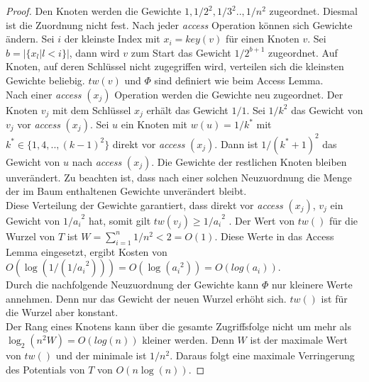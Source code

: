 \documentclass[a4paper,12pt]{article}
\begin{document}
\begin{proof}
	Den Knoten werden die Gewichte $1, 1/2^2,1/3^2 .., 1/n^2$ zugeordnet. Diesmal ist die Zuordnung nicht fest. Nach jeder \textit{access} Operation können sich Gewichte ändern. Sei $i$ der kleinste Index mit $x_i = \mathit{key}\left(v\right)$ für einen Knoten $v$. Sei $b = \vert\{x_l \vert l < i\}\vert$, dann wird $v$ zum Start das Gewicht $1 / 2^{b+1}$ zugeordnet. Auf Knoten, auf deren Schlüssel nicht zugegriffen wird, verteilen sich die kleinsten Gewichte beliebig. $\mathit{tw}\left(v\right)$ und $\Phi$ sind definiert wie beim Access Lemma.\\
	Nach einer \textit{access} $\left(x_j\right)$ Operation werden die Gewichte neu zugeordnet. Der Knoten $v_j$ mit dem Schlüssel $x_j$ erhält das Gewicht $1/1$. Sei $1/k^2$ das Gewicht von $v_j$ vor \textit{access} $\left(x_j\right)$. Sei $u$ ein Knoten mit $w\left(u\right) = 1 / k^*$ mit \\ $k^* \in \{1, 4,.., \left(k-1\right)^2\}$ direkt vor \textit{access} $\left(x_j\right)$. Dann ist $1 /\left(k^* + 1\right)^2$ das Gewicht von $u$ nach \textit{access} $\left(x_j\right)$. Die Gewichte der restlichen Knoten bleiben unverändert. Zu beachten ist, dass nach einer solchen Neuzuordnung die Menge der im Baum enthaltenen Gewichte unverändert bleibt. \\
	Diese Verteilung der Gewichte garantiert, dass direkt vor  \textit{access} $\left(x_j\right)$, $v_j$ ein Gewicht von ${1 /a_i}^2$ hat, somit gilt $\mathit{tw}\left(v_j\right) \geq {1 /a_i}^2$ . Der Wert von $\mathit{tw}\left(\right)$ für die Wurzel von $T$ ist $W = \sum_{i = 1}^{n} 1/ n^2 < 2 = O\left(1\right) $. Diese Werte in das Access Lemma eingesetzt, ergibt Kosten von \\ $O\left(\log\left(1 / \left({1 /a_i}^2\right)\right)\right) = O\left(\log\left({a_i}^2 \right)\right) = O\left(log\left(a_i\right)\right)$.\\
	 Durch die nachfolgende Neuzuordnung der Gewichte kann $\Phi$ nur kleinere Werte annehmen. Denn nur das Gewicht der neuen Wurzel erhöht sich. $\mathit{tw}\left(\right)$ ist für die Wurzel aber konstant.\\
	Der Rang eines Knotens kann über die gesamte Zugriffsfolge nicht um mehr als $\log_2\left(n^2 W\right) = O\left(log\left(n\right)\right)$ kleiner werden. Denn $W$ ist der maximale Wert von $\mathit{tw}\left(\right)$ und  der minimale ist $1 /n^2$. Daraus folgt eine maximale Verringerung des Potentials von $T$ von $O\left(n \log \left(n\right)\right)$. 
\end{proof}
\end{document}
